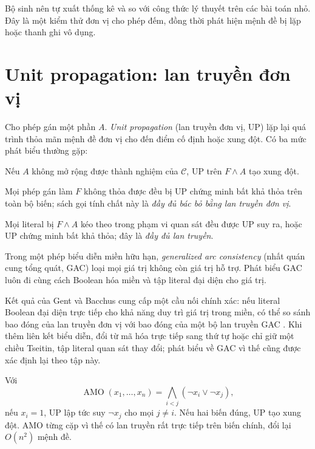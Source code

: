 Bộ sinh nên tự xuất thống kê và so với công thức lý thuyết trên các bài toán
nhỏ. Đây là một kiểm thử đơn vị cho phép đếm, đồng thời phát hiện mệnh đề bị lặp hoặc
thanh ghi vô dụng.

\section{Unit propagation: lan truyền đơn vị}

Cho phép gán một phần \(A\). \emph{Unit propagation} (lan truyền đơn vị, UP)
lặp lại quá trình thỏa mãn mệnh đề
đơn vị cho
đến điểm cố định hoặc xung đột. Có ba mức phát biểu thường gặp:

\begin{description}[style=nextline]
  \item[UP phát hiện vi phạm]
  Nếu \(A\) không mở rộng được thành nghiệm của \(\mathcal C\), UP trên
  \(F\land A\) tạo xung đột.

  \item[Unit-refutation completeness (URC)]
  Mọi phép gán làm \(F\) không thỏa được đều bị UP chứng minh bất khả thỏa
  trên toàn bộ biến; sách gọi tính chất này là \emph{đầy đủ bác bỏ bằng lan
  truyền đơn vị}.

  \item[Propagation completeness (PC)]
  Mọi literal bị \(F\land A\) kéo theo trong phạm vi quan sát đều được UP suy
  ra, hoặc UP chứng minh bất khả thỏa; đây là \emph{đầy đủ lan truyền}.
\end{description}

Trong một phép biểu diễn miền hữu hạn, \emph{generalized arc consistency}
(nhất quán cung tổng quát, GAC) loại mọi giá trị không còn giá trị hỗ trợ.
Phát biểu GAC luôn đi cùng cách Boolean hóa miền và tập literal đại diện cho
giá trị.

Kết quả của Gent và Bacchus cung cấp một cầu nối chính xác: nếu literal Boolean
đại diện trực tiếp cho khả năng duy trì giá trị trong miền, có thể so sánh bao đóng
của lan truyền đơn vị với bao đóng của một bộ lan truyền GAC
\parencite{gent2002arc,bacchus2007gac}. Khi thêm liên kết biểu diễn, đổi từ mã
hóa trực tiếp sang thứ tự hoặc chỉ giữ một chiều Tseitin, tập literal quan sát
thay đổi; phát biểu về GAC vì thế cũng được xác định lại theo tập này.

\begin{example}
Với
\[
  \operatorname{AMO}(x_1,\ldots,x_n)=
  \bigwedge_{i<j}(\neg x_i\lor\neg x_j),
\]
nếu \(x_i=1\), UP lập tức suy \(\neg x_j\) cho mọi \(j\ne i\). Nếu hai biến
đúng, UP tạo xung đột. AMO từng cặp vì thế có lan truyền rất trực tiếp trên
biến chính, đổi lại \(O(n^2)\) mệnh đề.
\end{example}


